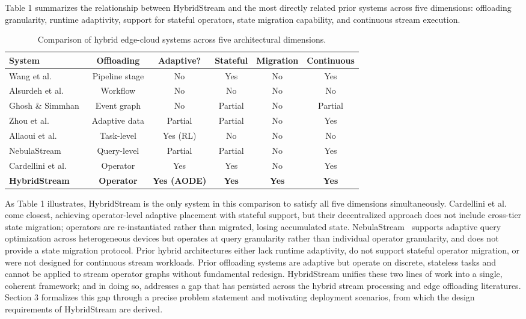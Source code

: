 \documentclass[preprint,review,12pt]{elsarticle}
\begin{document}
Table 1 summarizes the relationship between HybridStream and the most directly related prior systems across five dimensions: offloading granularity, runtime adaptivity, support for stateful operators, state migration capability, and continuous stream execution.


\begin{table}[htbp]
\centering
\caption{Comparison of hybrid edge-cloud systems across five architectural dimensions.}
\label{tab:comparison}
\begin{tabular}{@{}lccccc@{}}
\toprule
System & Offloading & Adaptive? & Stateful & Migration & Continuous \\
\midrule
Wang et al.~\cite{wang2022edgecloud} & Pipeline stage & No & Yes & No & Yes \\
Alsurdeh et al.~\cite{alsurdeh2021hybrid} & Workflow & No & No & No & No \\
Ghosh \& Simmhan~\cite{ghosh2017scheduling} & Event graph & No & Partial & No & Partial \\
Zhou et al.~\cite{zhou2019edge} & Adaptive data & Partial & Partial & No & Yes \\
Allaoui et al.~\cite{allaoui2024rl} & Task-level & Yes (RL) & No & No & No \\
NebulaStream~\cite{zeuch2020nebulastream} & Query-level & Partial & Partial & No & Yes \\
Cardellini et al.~\cite{cardellini2018decentralized} & Operator & Yes & Yes & No & Yes \\
\textbf{HybridStream} & \textbf{Operator} & \textbf{Yes (AODE)} & \textbf{Yes} & \textbf{Yes} & \textbf{Yes} \\
\bottomrule
\end{tabular}
\end{table}


As Table 1 illustrates, HybridStream is the only system in this comparison to satisfy all five dimensions simultaneously. Cardellini et al.~\cite{cardellini2018decentralized} come closest, achieving operator-level adaptive placement with stateful support, but their decentralized approach does not include cross-tier state migration; operators are re-instantiated rather than migrated, losing accumulated state. NebulaStream~\cite{zeuch2020nebulastream} supports adaptive query optimization across heterogeneous devices but operates at query granularity rather than individual operator granularity, and does not provide a state migration protocol. Prior hybrid architectures either lack runtime adaptivity, do not support stateful operator migration, or were not designed for continuous stream workloads. Prior offloading systems are adaptive but operate on discrete, stateless tasks and cannot be applied to stream operator graphs without fundamental redesign. HybridStream unifies these two lines of work into a single, coherent framework; and in doing so, addresses a gap that has persisted across the hybrid stream processing and edge offloading literatures. Section 3 formalizes this gap through a precise problem statement and motivating deployment scenarios, from which the design requirements of HybridStream are derived.
\end{document}
